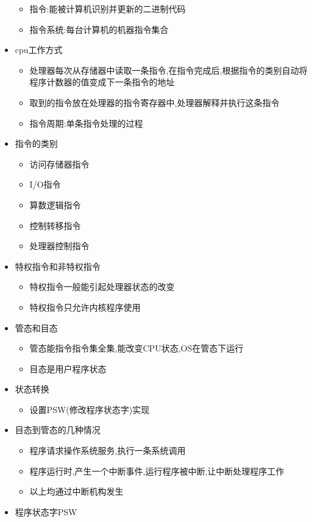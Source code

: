 \documentclass[a4paper,12pt,notitlepage]{article}
\begin{document}
\begin{itemize}
\begin{itemize}
		\item 指令:能被计算机识别并更新的二进制代码
		\item 指令系统:每台计算机的机器指令集合
	\end{itemize}
	\item cpu工作方式
	\begin{itemize}
		\item 处理器每次从存储器中读取一条指令,在指令完成后,根据指令的类别自动将程序计数器的值变成下一条指令的地址
		\item 取到的指令放在处理器的指令寄存器中,处理器解释并执行这条指令
		\item 指令周期:单条指令处理的过程
	\end{itemize}
	\item 指令的类别
	\begin{itemize}
		\item 访问存储器指令
		\item I/O指令
		\item 算数逻辑指令
		\item 控制转移指令
		\item 处理器控制指令
	\end{itemize}
	\item 特权指令和非特权指令
	\begin{itemize}
		\item 特权指令一般能引起处理器状态的改变
		\item 特权指令只允许内核程序使用
	\end{itemize}
	\item 管态和目态
	\begin{itemize}
		\item 管态能指令指令集全集,能改变CPU状态,OS在管态下运行
		\item 目态是用户程序状态
	\end{itemize}
	\item 状态转换
	\begin{itemize}
		\item 设置PSW(修改程序状态字)实现
	\end{itemize}
	\item 目态到管态的几种情况
	\begin{itemize}
		\item 程序请求操作系统服务,执行一条系统调用
		\item 程序运行时,产生一个中断事件,运行程序被中断,让中断处理程序工作
		\item 以上均通过中断机构发生
	\end{itemize}
	\item 程序状态字PSW

\end{itemize}
\end{document}
